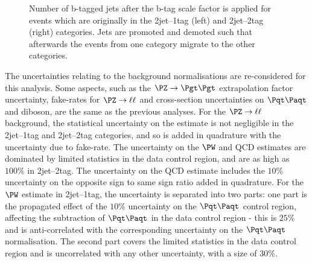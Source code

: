 \begin{figure}
\begin{center}

\end{center}
\caption[Number of b-tagged jets after the b-tag scale factor is applied for events which
are originally in the 2jet--1tag (left) and 2jet--2tag (right) categories.]{
Number of b-tagged jets after the b-tag scale factor is applied for events which
are originally in the 2jet--1tag (left) and 2jet--2tag (right) categories. Jets
are promoted and demoted such that afterwards the events from one category
migrate to the other categories.}
\label{fig:Hhhbtagsystematic}
\end{figure}

The uncertainties relating to the background normalisations are re-considered
for this analysis. Some aspects, such as the $\ZToTauTau$ extrapolation factor
uncertainty, fake-rates for $\PZ\to\ell\ell$ and cross-section uncertainties on
$\ttbar$ and diboson, are the same as the previous analyses. For the
$\PZ\to\ell\ell$ background, the statistical uncertainty on the estimate is not
negligible in the 2jet--1tag and 2jet--2tag categories, and so is added in
quadrature with the uncertainty due to fake-rate. The uncertainty on the
$\PW$ and QCD estimates are dominated by limited statistics in the data control
region, and are as high as $100\%$ in 2jet--2tag. The uncertainty on the QCD
estimate includes the $10\%$ uncertainty on the opposite sign to same sign ratio
added in quadrature. For the $\PW$ estimate in 2jet--1tag, the uncertainty is
separated into two parts: one part is the propagated effect of the $10\%$
uncertainty on the $\ttbar$ control region, affecting the subtraction of
$\ttbar$ in the data control region - this is $25\%$ and is anti-correlated with
the corresponding uncertainty on the $\ttbar$ normalisation. The second part
covers the limited statistics in the data control region and is uncorrelated
with any other uncertainty, with a size of $30\%$.

